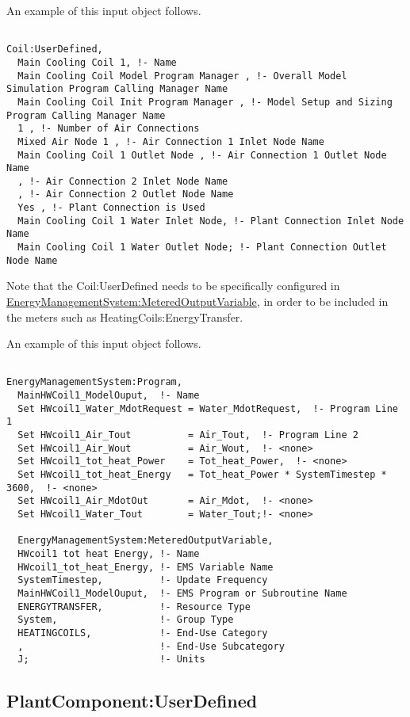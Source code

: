 An example of this input object follows.

\begin{lstlisting}

Coil:UserDefined,
  Main Cooling Coil 1, !- Name
  Main Cooling Coil Model Program Manager , !- Overall Model Simulation Program Calling Manager Name
  Main Cooling Coil Init Program Manager , !- Model Setup and Sizing Program Calling Manager Name
  1 , !- Number of Air Connections
  Mixed Air Node 1 , !- Air Connection 1 Inlet Node Name
  Main Cooling Coil 1 Outlet Node , !- Air Connection 1 Outlet Node Name
  , !- Air Connection 2 Inlet Node Name
  , !- Air Connection 2 Outlet Node Name
  Yes , !- Plant Connection is Used
  Main Cooling Coil 1 Water Inlet Node, !- Plant Connection Inlet Node Name
  Main Cooling Coil 1 Water Outlet Node; !- Plant Connection Outlet Node Name
\end{lstlisting}

Note that the Coil:UserDefined needs to be specifically configured in \hyperref[energymanagementsystemmeteredoutputvariable]{EnergyManagementSystem:MeteredOutputVariable}, in order to be included in the meters such as HeatingCoils:EnergyTransfer.

An example of this input object follows.

\begin{lstlisting}

EnergyManagementSystem:Program,
  MainHWCoil1_ModelOuput,  !- Name
  Set HWcoil1_Water_MdotRequest = Water_MdotRequest,  !- Program Line 1
  Set HWcoil1_Air_Tout          = Air_Tout,  !- Program Line 2
  Set HWcoil1_Air_Wout          = Air_Wout,  !- <none>
  Set HWcoil1_tot_heat_Power    = Tot_heat_Power,  !- <none>
  Set HWcoil1_tot_heat_Energy   = Tot_heat_Power * SystemTimestep * 3600,  !- <none>
  Set HWcoil1_Air_MdotOut       = Air_Mdot,  !- <none>
  Set HWcoil1_Water_Tout        = Water_Tout;!- <none>

  EnergyManagementSystem:MeteredOutputVariable,
  HWcoil1 tot heat Energy, !- Name
  HWcoil1_tot_heat_Energy, !- EMS Variable Name
  SystemTimestep,          !- Update Frequency
  MainHWCoil1_ModelOuput,  !- EMS Program or Subroutine Name
  ENERGYTRANSFER,          !- Resource Type
  System,                  !- Group Type
  HEATINGCOILS,            !- End-Use Category
  ,                        !- End-Use Subcategory
  J;                       !- Units
\end{lstlisting}

\subsection{PlantComponent:UserDefined}\label{plantcomponentuserdefined}

